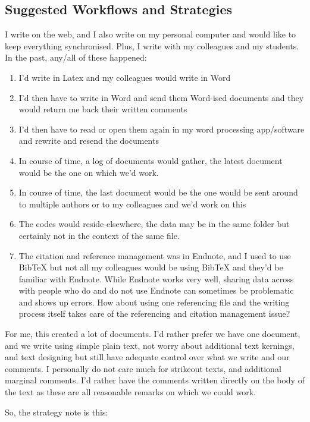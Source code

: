 \subsection{Suggested Workflows and Strategies}

I write on the web, and I also write on my personal computer and would like to keep everything synchronised. Plus, I write with my colleagues and my students. In the past, any/all of these happened:

\begin{enumerate}
\item I'd write in Latex and my colleagues would write in Word
\item I'd then have to write in Word and send them Word-ised documents and they would return me back their written comments
\item I'd then have to read or open them again in my word processing app/software and rewrite and resend the documents
\item In course of time, a log of documents would gather, the latest document would be the one on which we'd work.
\item In course of time, the last document would be the one would be sent around to multiple authors or to my colleagues and we'd work on this
\item The codes would reside elsewhere, the data may be in the same folder but certainly not in the context of the same file. 
\item The citation and reference management was in Endnote, and I used to use BibTeX but not all my colleagues would be using BibTeX and they'd be familiar with Endnote. While Endnote works very well, sharing data across with people who do and do not use Endnote can sometimes be problematic and shows up errors. How about using one referencing file and the writing process itself takes care of the referencing and citation management issue?
\end{enumerate}

For me, this created a lot of documents. I'd rather prefer we have one document, and we write using simple plain text, not worry about additional text kernings, and text designing but still have adequate control over what we write and our comments. I personally do not care much for strikeout texts, and additional marginal comments. I'd rather have the comments written directly on the body of the text as these are all reasonable remarks on which we could work. 

So, the strategy note is this:

